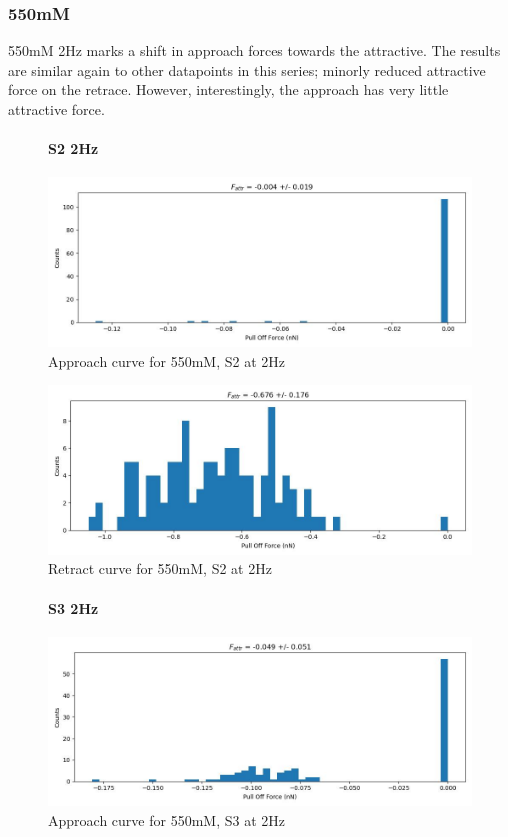 \subsubsection*{550mM}
550mM 2Hz marks a shift in approach forces towards the attractive. The results are similar again to other datapoints in this series; minorly reduced attractive force on the retrace. However, interestingly, the approach has very little attractive force. 
\begin{figure}[h!]
\paragraph{S2 2Hz}
\centering
\includegraphics[width=\textwidth]{chapter7/Tip speed/550mM/S2 2Hz/approach_f_a_hist.jpg}
\caption{Approach curve for 550mM, S2 at 2Hz}
\end{figure}

\begin{figure}[h!]
\centering
\includegraphics[width=\textwidth]{chapter7/Tip speed/550mM/S2 2Hz/retract_f_a_hist.jpg}
\caption{Retract curve for 550mM, S2 at 2Hz}
\end{figure}


\begin{figure}[h!]
\paragraph{S3 2Hz}
\centering
\includegraphics[width=\textwidth]{chapter7/Tip speed/550mM/S3 2Hz/approach_f_a_hist.jpg}
\caption{Approach curve for 550mM, S3 at 2Hz}
\end{figure}

